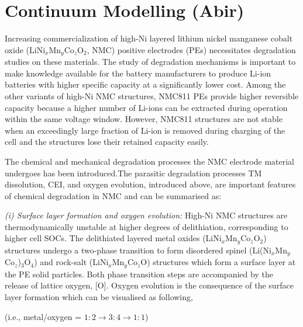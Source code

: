 \documentclass[aps,prb,twocolumn,superscriptaddress,reprint]{revtex4-1}
\begin{document}
\section{Continuum Modelling (Abir)}
Increasing commercialization of high-Ni layered lithium nickel manganese cobalt oxide (LiNi$_x$Mn$_y$Co$_z$O$_2$, NMC) positive electrodes (PEs) necessitates degradation studies on  these materials. The study of degradation mechanisms is important to make knowledge available for the battery manufacturers to produce Li-ion batteries with higher specific capacity at a significantly lower cost. \cite{du2020battery,jaguemont2016comprehensive} Among the other variants of high-Ni NMC structures, NMC811 PEs provide higher reversible capacity because a higher number of Li-ions can be extracted during operation within the same voltage window. \cite{andre2015future,noh2013comparison} However, NMC811 structures are not stable when an exceedingly large fraction of Li-ion is removed during charging of the cell and the structures lose their retained capacity easily. \cite{gabrisch2008transmission,liu2015nickel}

The chemical and mechanical degradation processes the NMC electrode material undergoes has been introduced.The parasitic degradation processes TM dissolution, CEI, and oxygen evolution, introduced above,  are important features of chemical degradation in NMC and can be summarised as:

\textit{(i) Surface layer formation and oxygen evolution:} High-Ni NMC structures are thermodynamically unstable at higher degrees of delithiation, corresponding to higher cell SOCs. The delithiated layered metal oxides (LiNi$_x$Mn$_y$Co$_z$O$_2$) structures undergo a two-phase transition to form disordered spinel (Li(Ni$_x$Mn$_y$Co$_z$)$_3$O$_4$) and rock-salt (LiNi$_x$Mn$_y$Co$_z$O) structures which form a surface layer at the PE solid particles. \cite{bak2013correlating,bak2014structural} Both phase transition steps are accompanied by the release of lattice oxygen, [O]. \cite{jung2014understanding,jung2017oxygen, jung2017chemical} Oxygen evolution is the consequence of the surface layer formation which can be visualised as following,

\begin{center}
     \newline 
(i.e., metal/oxygen = $1:2 \to 3:4 \to 1:1$)
\end{center}
\end{document}
